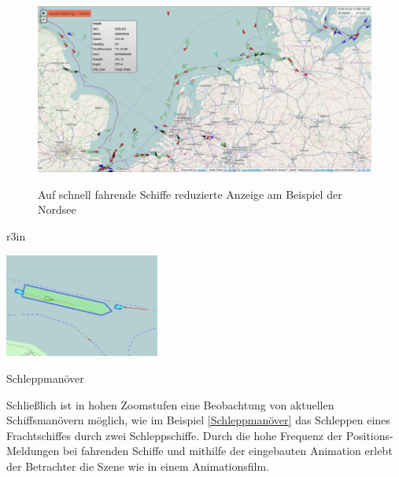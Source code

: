 \begin {figure}[H]
\begin{center}
  \includegraphics[width=6in]{images/zoomout.png}
\end{center}
\caption{Auf schnell fahrende Schiffe reduzierte Anzeige am Beispiel der Nordsee}
\label{Nordsee}
\end {figure}

\begin {wrapfigure}[9]{r}{3in}
\begin{center}
  \includegraphics[width=2in]{images/Schleppen.png}
 \caption{Schleppmanöver}
  \end{center}
 \label{Schleppmanöver}

\end {wrapfigure}


Schließlich ist in hohen Zoomstufen eine Beobachtung von aktuellen Schiffsmanövern möglich, wie im Beispiel \ref{Schleppmanöver} das Schleppen eines Frachtschiffes durch zwei Schleppschiffe. Durch die hohe Frequenz der Positions-Meldungen bei fahrenden Schiffe und mithilfe der eingebauten Animation erlebt der Betrachter die Szene wie in einem Animationsfilm.\\

